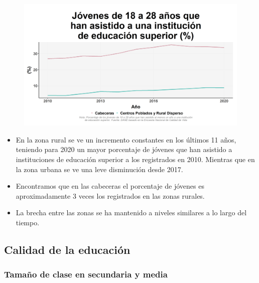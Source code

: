     \begin{figure}[H]
        \caption[Jóvenes de 18 a 28 años que han asistido a una institución de educación superior por zonas ]{\label{asist_edusup_zona_trend} }
        \begin{center}
        \includegraphics[width=\textwidth,keepaspectratio]{img/var_128_trend.png}
        \end{center}
    \end{figure}
            \begin{itemize}
                \item En la zona rural se ve un incremento constantes en los últimos 11 años, teniendo para 2020 un mayor porcentaje de jóvenes que han asistido a instituciones de educación superior a los registrados en 2010. Mientras que en la zona urbana se ve una leve disminución desde 2017.
                \item Encontramos que en las cabeceras el porcentaje de jóvenes es aproximadamente 3 veces los registrados en las zonas rurales.
                \item La brecha entre las zonas se ha mantenido a niveles similares a lo largo del tiempo.
                \end{itemize}

    \subsection{Calidad de la educación}
        \subsubsection{Tamaño de clase en secundaria y media}

